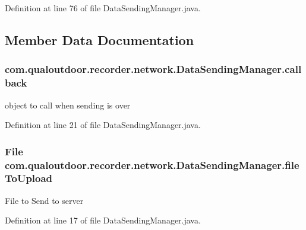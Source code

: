 Definition at line 76 of file Data\-Sending\-Manager.\-java.



\subsection{Member Data Documentation}
\hypertarget{classcom_1_1qualoutdoor_1_1recorder_1_1network_1_1DataSendingManager_a6792b0b030b25ad8cc338196a3cd43cd}{
\subsubsection[{callback}]{ com.\-qualoutdoor.\-recorder.\-network.\-Data\-Sending\-Manager.\-callback\hspace{0.3cm}{\ttfamily [private]}}}\label{classcom_1_1qualoutdoor_1_1recorder_1_1network_1_1DataSendingManager_a6792b0b030b25ad8cc338196a3cd43cd}
object to call when sending is over 

Definition at line 21 of file Data\-Sending\-Manager.\-java.

\hypertarget{classcom_1_1qualoutdoor_1_1recorder_1_1network_1_1DataSendingManager_a04c3eb72f14a6b304204d5995ebc47b5}{
\subsubsection[{file\-To\-Upload}]{\setlength{\rightskip}{0pt plus 5cm}File com.\-qualoutdoor.\-recorder.\-network.\-Data\-Sending\-Manager.\-file\-To\-Upload\hspace{0.3cm}{\ttfamily [private]}}}\label{classcom_1_1qualoutdoor_1_1recorder_1_1network_1_1DataSendingManager_a04c3eb72f14a6b304204d5995ebc47b5}
File to Send to server 

Definition at line 17 of file Data\-Sending\-Manager.\-java.



